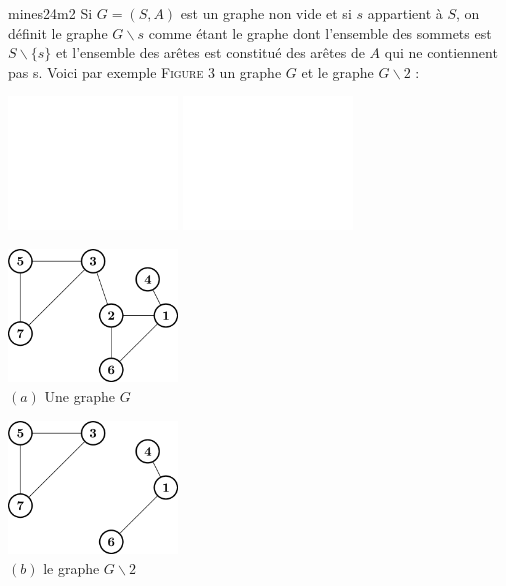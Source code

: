 \documentclass[11pt,solution]{cpgedev}
\begin{document}
\begin{enonce}{mines24m2}
Si $G=(S, A)$ est un graphe non vide et si $s$ appartient à $S$, on définit le graphe $G \backslash s$ comme étant le graphe dont l'ensemble des sommets est $S \backslash\{s\}$ et l'ensemble des arêtes est constitué des arêtes de $A$ qui ne contiennent pas s. Voici par exemple \textsc{Figure 3} un graphe $G$ et le graphe $G \backslash 2$ :

\begin{center}
    \ifdark 
        \includegraphics[width=4.5cm]{graphs/graph-dark-2}
        \endminipage
        \hfill\vrule width .4pt\hfill
        \includegraphics[width=4.5cm]{graphs/graph-dark-3}
        \endminipage
    \else 
        \begin{minipage}{.5\linewidth-1.2em}
        \centering
        \includegraphics[width=4.5cm]{graphs/graph-2}
         \\ $(a)$ Une graphe $G$
        \end{minipage}
        \hfill\vrule width .4pt\hfill
        \begin{minipage}{.5\linewidth-1.2em}
            \centering
        \includegraphics[width=4.5cm]{graphs/graph-3}
        \\ $(b)$ le graphe $G\backslash 2$
        \end{minipage}
    \fi 
\end{center}



\end{enonce}
\end{document}
